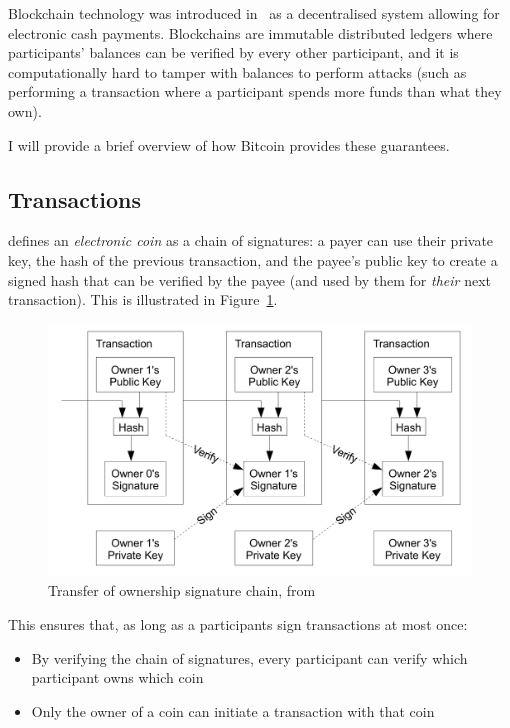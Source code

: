 Blockchain technology was introduced in~\cite{nakamoto2008bitcoin} as a decentralised system allowing for electronic
cash payments.
Blockchains are immutable distributed ledgers where participants' balances can be verified by every other participant,
and it is computationally hard to tamper with balances to perform attacks (such as performing a transaction where a
participant spends more funds than what they own).

I will provide a brief overview of how Bitcoin provides these guarantees.

\subsection{Transactions}\label{subsec:btc:txs}

\cite{nakamoto2008bitcoin} defines an \textit{electronic coin} as a chain of signatures: a payer can use their private
key, the hash of the previous transaction, and the payee's public key to create a signed hash that can be verified by
the payee (and used by them for \textit{their} next transaction).
This is illustrated in Figure~\ref{fig:bitcoin-tx}.

\begin{figure}[th]
    \centering
    \includegraphics[width=0.8\columnwidth]{figures/bitcoin-tx}
    \caption[Bitcoin coin ownership transfer]{Transfer of ownership signature chain, from~\cite{nakamoto2008bitcoin}}
    \label{fig:bitcoin-tx}
\end{figure}

This ensures that, as long as a participants sign transactions at most once:
\begin{itemize}
    \item By verifying the chain of signatures, every participant can verify which participant owns which coin
    \item Only the owner of a coin can initiate a transaction with that coin
\end{itemize}


